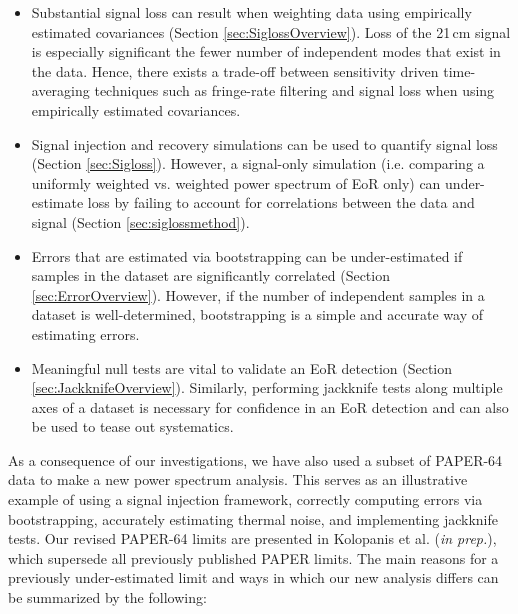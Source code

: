 \documentclass[preprint2,numberedappendix,tighten]{aastex6}  %
\begin{document}
\begin{itemize}
\item Substantial signal loss can result when weighting data using empirically estimated covariances (Section 
\ref{sec:SiglossOverview}). Loss of the 21\,cm signal is especially significant the fewer number of independent modes that
exist in the data. Hence, there exists a trade-off between sensitivity driven 
time-averaging techniques such as fringe-rate filtering and signal loss when using empirically estimated covariances. 
\item Signal injection and recovery simulations can be used to quantify signal loss (Section \ref{sec:Sigloss}). However, a 
signal-only simulation (i.e. comparing a uniformly weighted vs. weighted power spectrum of EoR only) can under-estimate loss by 
failing to account for correlations between the data and signal (Section \ref{sec:siglossmethod}).
\item Errors that are estimated via bootstrapping can be under-estimated if samples in the dataset are significantly correlated 
(Section \ref{sec:ErrorOverview}). However, if the number of independent samples in a dataset is well-determined, bootstrapping is a 
simple and accurate way of estimating errors.
\item Meaningful null tests are vital to validate an EoR detection (Section \ref{sec:JackknifeOverview}). Similarly, performing 
jackknife tests along multiple axes of a dataset is necessary for confidence in an EoR detection and can also be used to tease 
out systematics.
\end{itemize}

As a consequence of our investigations, we have also used a subset of PAPER-64 data to make a new power spectrum analysis. This serves as an illustrative example of using a signal injection framework, correctly computing errors via bootstrapping, accurately estimating thermal noise, and implementing jackknife tests. Our revised PAPER-64 limits are presented in Kolopanis et al. (\textit{in prep.}), which supersede all previously published PAPER limits. The main reasons for a previously under-estimated limit and 
ways in which our new analysis differs can be summarized by the following:
\end{document}
